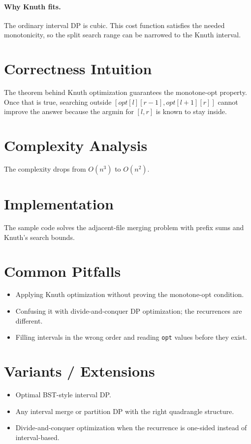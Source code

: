 \paragraph{Why Knuth fits.}
The ordinary interval DP is cubic. This cost function satisfies the needed monotonicity, so the split search range can
be narrowed to the Knuth interval.

\section*{Correctness Intuition}

The theorem behind Knuth optimization guarantees the monotone-opt property. Once that is true, searching outside
\([opt[l][r-1], opt[l+1][r]]\) cannot improve the answer because the argmin for \([l,r]\) is known to stay inside.

\section*{Complexity Analysis}

The complexity drops from \(O(n^3)\) to \(O(n^2)\).

\section*{Implementation}

The sample code solves the adjacent-file merging problem with prefix sums and Knuth's search bounds.

\section*{Common Pitfalls}

\begin{itemize}
  \item Applying Knuth optimization without proving the monotone-opt condition.
  \item Confusing it with divide-and-conquer DP optimization; the recurrences are different.
  \item Filling intervals in the wrong order and reading \texttt{opt} values before they exist.
\end{itemize}

\section*{Variants / Extensions}

\begin{itemize}
  \item Optimal BST-style interval DP.
  \item Any interval merge or partition DP with the right quadrangle structure.
  \item Divide-and-conquer optimization when the recurrence is one-sided instead of interval-based.
\end{itemize}

